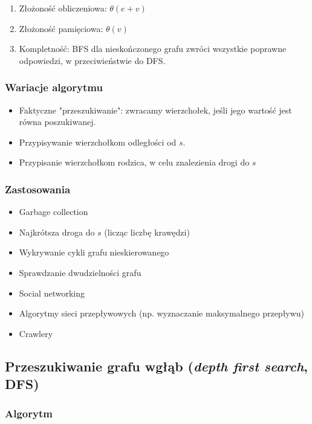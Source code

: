\documentclass[main.tex]{subfiles}
\begin{document}
    \begin{enumerate}
        \item Złożoność obliczeniowa: $\theta(e + v)$
        \item Złożoność pamięciowa: $\theta(v)$
        \item Kompletność: BFS dla nieskończonego grafu zwróci wszystkie poprawne
        odpowiedzi, w przeciwieństwie do DFS.
    \end{enumerate}

    \subsubsection{Wariacje algorytmu}

    \begin{itemize}
        \item Faktyczne "przeszukiwanie": zwracamy wierzchołek, jeśli jego wartość jest
        równa poszukiwanej.
        \item Przypisywanie wierzchołkom odległości od $s$.
        \item Przypisanie wierzchołkom rodzica, w celu znalezienia drogi do $s$
    \end{itemize}

    \subsubsection{Zastosowania}

    \begin{itemize}
        \item Garbage collection
        \item Najkrótsza droga do $s$ (licząc liczbę krawędzi)
        \item Wykrywanie cykli grafu nieskierowanego
        \item Sprawdzanie dwudzielności grafu
        \item Social networking
        \item Algorytmy sieci przepływowych (np. wyznaczanie maksymalnego przepływu)
        \item Crawlery
    \end{itemize}

    \subsection{Przeszukiwanie grafu wgłąb (\textit{depth first search}, DFS)}

    \subsubsection{Algorytm}
\end{document}
